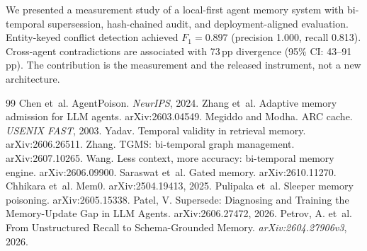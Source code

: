 \documentclass{llncs}
\begin{document}
We presented a measurement study of a local-first agent memory system with bi-temporal supersession, hash-chained audit, and deployment-aligned evaluation. Entity-keyed conflict detection achieved $F_1{=}0.897$ (precision 1.000, recall 0.813). Cross-agent contradictions are associated with 73\,pp divergence (95\% CI: 43--91\,pp). The contribution is the measurement and the released instrument, not a new architecture.
\enlargethispage{10\baselineskip}
\scriptsize
\begin{thebibliography}{99}
Chen et~al. AgentPoison. \emph{NeurIPS}, 2024.
Zhang et~al. Adaptive memory admission for LLM agents. arXiv:2603.04549.
Megiddo and Modha. ARC cache. \emph{USENIX FAST}, 2003.
Yadav. Temporal validity in retrieval memory. arXiv:2606.26511.
Zhang. TGMS: bi-temporal graph management. arXiv:2607.10265.
Wang. Less context, more accuracy: bi-temporal memory engine. arXiv:2606.09900.
Saraswat et~al. Gated memory. arXiv:2610.11270.
Chhikara et~al. Mem0. arXiv:2504.19413, 2025.
Pulipaka et~al. Sleeper memory poisoning. arXiv:2605.15338.
Patel, V. Supersede: Diagnosing and Training the Memory-Update Gap in LLM
Agents. arXiv:2606.27472, 2026.
Petrov, A. et~al.
From Unstructured Recall to Schema-Grounded Memory.
\emph{arXiv:2604.27906v3}, 2026.
\end{thebibliography}
\end{document}
